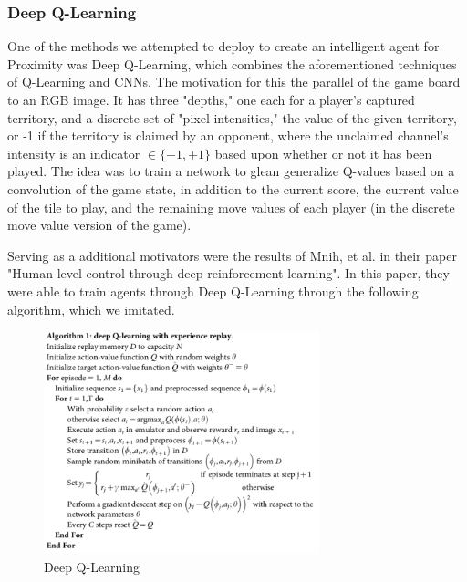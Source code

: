 \documentclass[letterpaper]{article}
\begin{document}
\subsubsection{Deep Q-Learning}
\par
One of the methods we attempted to deploy to create an intelligent agent for Proximity was Deep Q-Learning, which combines the aforementioned 
techniques of Q-Learning and CNNs.  The motivation for this the parallel of the game board to an RGB image. It has three "depths," one each for a 
player's captured territory, and a discrete set of "pixel intensities," the value of the given territory, or -1 if the territory is claimed by an opponent, where 
the unclaimed channel's intensity is an indicator $\in \{-1,+1\}$ based upon whether or not it has been played.  The idea was to train a network to glean 
generalize Q-values based on a convolution of the game state, in addition to the current score, the current value of the tile to play, and the remaining move values of each player (in the discrete move value version of the game).
\par
Serving as a additional motivators were the results of Mnih, et al. in their paper "Human-level control through deep reinforcement learning"\cite{mnih}. In this paper, they were able to train agents through Deep Q-Learning through the following algorithm, which we imitated.
\begin{figure}[H]
	\centering
	\includegraphics[width=8cm]{deepqalgo.png}
	\caption{Deep Q-Learning}
\end{figure}
\end{document}
